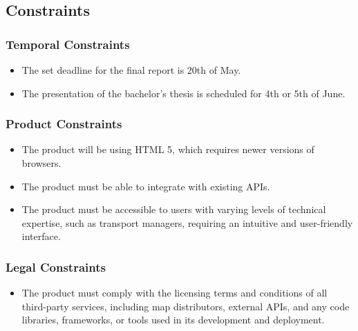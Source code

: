 \subsection{Constraints}
\subsubsection{Temporal Constraints}
\begin{itemize}
    \item The set deadline for the final report is 20th of May.
    \item The presentation of the bachelor's thesis is scheduled for 4th or 5th of June.
\end{itemize}

\subsubsection{Product Constraints}
\begin{itemize}
    \item The product will be using HTML 5, which requires newer versions of browsers.
    \item The product must be able to integrate with existing APIs.
    \item The product must be accessible to users with varying levels of technical expertise, such as transport managers, requiring an intuitive and user-friendly interface.
\end{itemize}

\subsubsection{Legal Constraints}
\begin{itemize}
    \item The product must comply with the licensing terms and conditions of all third-party services, including map distributors, external APIs, and any code libraries, frameworks, or tools used in its development and deployment.
\end{itemize}